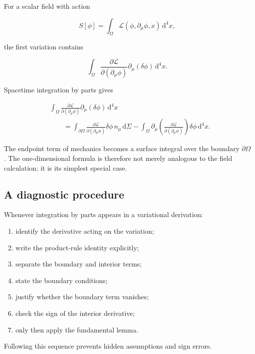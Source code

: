 For a scalar field with action

\[
S[\phi]
=
\int_{\Omega}
\mathcal{L}(\phi,\partial_{\mu}\phi,x)
\,\mathrm{d}^{4}x,
\]

the first variation contains

\[
\int_{\Omega}
\frac{\partial\mathcal{L}}
{\partial(\partial_{\mu}\phi)}
\partial_{\mu}(\delta\phi)
\,\mathrm{d}^{4}x.
\]

Spacetime integration by parts gives

\[
\begin{aligned}
&\int_{\Omega}
\frac{\partial\mathcal{L}}
{\partial(\partial_{\mu}\phi)}
\partial_{\mu}(\delta\phi)
\,\mathrm{d}^{4}x\\
&\qquad=
\int_{\partial\Omega}
\frac{\partial\mathcal{L}}
{\partial(\partial_{\mu}\phi)}
\delta\phi\,n_{\mu}
\,\mathrm{d}\Sigma
-
\int_{\Omega}
\partial_{\mu}
\left(
\frac{\partial\mathcal{L}}
{\partial(\partial_{\mu}\phi)}
\right)
\delta\phi
\,\mathrm{d}^{4}x.
\end{aligned}
\]

The endpoint term of mechanics becomes a surface integral over the boundary \(\partial\Omega\). The one-dimensional formula is therefore not merely analogous to the field calculation; it is its simplest special case.

\subsection{A diagnostic procedure}

Whenever integration by parts appears in a variational derivation:

\begin{enumerate}
    \item identify the derivative acting on the variation;
    \item write the product-rule identity explicitly;
    \item separate the boundary and interior terms;
    \item state the boundary conditions;
    \item justify whether the boundary term vanishes;
    \item check the sign of the interior derivative;
    \item only then apply the fundamental lemma.
\end{enumerate}

Following this sequence prevents hidden assumptions and sign errors.

